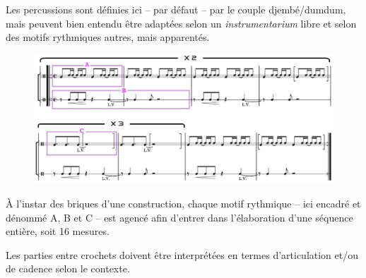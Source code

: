Les percussions sont définies ici -- par défaut -- par le couple djembé/dumdum, mais peuvent bien entendu être adaptées selon un \textit{instrumentarium} libre et selon des motifs rythmiques autres, mais apparentés.

 
 \begin{figure}[H]
\begin{center}
\includegraphics[scale=0.68]{img/dlc5}
\end{center}
\end{figure}

À l’instar des briques d’une construction, chaque motif rythmique --  ici encadré et dénommé A, B et C -- est agencé afin d’entrer dans l’élaboration d’une séquence entière, soit 16 mesures.

Les parties entre crochets doivent être interprétées en termes d'articulation et/ou de cadence selon le contexte.
